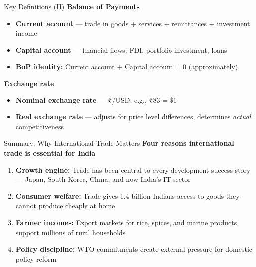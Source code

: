 \documentclass[
  ignorenonframetext,
  aspectratio=169,
]{beamer}
\makeatletter
\providecommand{\tightlist}{%
  \setlength{\itemsep}{0pt}\setlength{\parskip}{0pt}}
\let\quarto@originallabel\label
\DeclareRobustCommand*{\label}[1]{\quarto@originallabel{#1}}
\makeatother
\begin{document}
\begin{frame}{Key Definitions (II)}
\label{key-definitions-ii}
\textbf{Balance of Payments}

\begin{itemize}
\tightlist
\item
  \textbf{Current account} --- trade in goods + services + remittances +
  investment income
\item
  \textbf{Capital account} --- financial flows: FDI, portfolio
  investment, loans
\item
  \textbf{BoP identity:} Current account + Capital account = 0
  (approximately)
\end{itemize}

\textbf{Exchange rate}

\begin{itemize}
\tightlist
\item
  \textbf{Nominal exchange rate} --- ₹/USD; e.g., ₹83 = \$1
\item
  \textbf{Real exchange rate} --- adjusts for price level differences;
  determines \emph{actual} competitiveness
\end{itemize}
\end{frame}

\begin{frame}{Summary: Why International Trade Matters}
\label{summary-why-international-trade-matters}
\textbf{Four reasons international trade is essential for India}

\begin{enumerate}
\item
  \textbf{Growth engine:} Trade has been central to every development
  success story --- Japan, South Korea, China, and now India's IT sector
\item
  \textbf{Consumer welfare:} Trade gives 1.4 billion Indians access to
  goods they cannot produce cheaply at home
\item
  \textbf{Farmer incomes:} Export markets for rice, spices, and marine
  products support millions of rural households
\item
  \textbf{Policy discipline:} WTO commitments create external pressure
  for domestic policy reform
\end{enumerate}

\end{frame}
\end{document}
